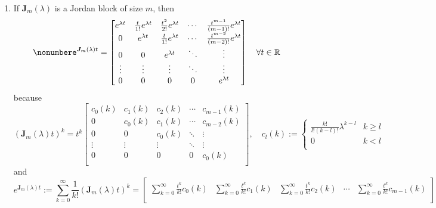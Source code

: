 \documentclass[12pt,a4paper]{article}
\begin{document}
\begin{itemize}
\begin{enumerate}
    \item If $\bm{J}_{m}(\lambda)$ is a Jordan block of size $m$, then
      \begin{equation}\nonumber%
        e^{\bm{J}_{m}(\lambda)t}
        =
        \begin{bmatrix}
          e^{\lambda t} & \frac{t}{1!}e^{\lambda t} & \frac{t^{2}}{2!}e^{\lambda t} & \cdots & \frac{t^{m-1}}{(m-1)!}e^{\lambda t} \\
          0 & e^{\lambda t} & \frac{t}{1!}e^{\lambda t} & \cdots & \frac{t^{m-2}}{(m-2)!}e^{\lambda t} \\
          0 & 0 & e^{\lambda t} & \ddots & \vdots \\
          \vdots & \vdots & \vdots & \ddots & \vdots \\
          0 & 0 & 0  & 0 & e^{\lambda t} \\
        \end{bmatrix}
        \quad \forall t \in \R
      \end{equation}
      because
    \begin{equation}\nonumber%
      (\bm{J}_{m}(\lambda)t)^{k}
      =
      t^{k}
      \begin{bmatrix}
        c_{0}(k) & c_{1}(k) & c_{2}(k) & \cdots & c_{m-1}(k) \\
        0 & c_{0}(k) & c_{1}(k) & \cdots & c_{m-2}(k) \\
        0 & 0 & c_{0}(k) & \ddots & \vdots \\
        \vdots & \vdots & \vdots & \ddots & \vdots \\
        0 & 0 & 0  & 0 & c_{0}(k) \\
      \end{bmatrix},
      \quad
      c_{l}(k) :=
      \begin{cases}
        \frac{k!}{l!(k-l)!}\lambda^{k-l} & k\geq l \\
        0 & k < l \\
      \end{cases}
    \end{equation}
    and
    \begin{equation}\nonumber%
      e^{\bm{J}_{m}(\lambda)t}
      := \sum_{k=0}^{\infty}\frac{1}{k!}(\bm{J}_{m}(\lambda)t)^{k}
      =
      \begin{bmatrix}
        \sum_{k=0}^{\infty}\frac{t^{k}}{k!}c_{0}(k) & \sum_{k=0}^{\infty}\frac{t^{k}}{k!}c_{1}(k) & \sum_{k=0}^{\infty}\frac{t^{k}}{k!}c_{2}(k) & \cdots & \sum_{k=0}^{\infty}\frac{t^{k}}{k!}c_{m-1}(k) \\

\end{bmatrix}
\end{equation}
\end{enumerate}
\end{itemize}
\end{document}
